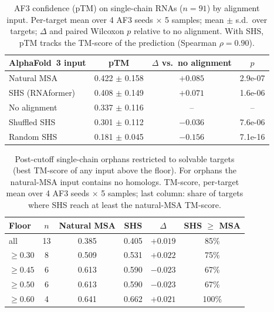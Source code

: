 \begin{table}[t]
\centering
\caption{AF3 confidence (pTM) on single-chain RNAs ($n{=}91$) by alignment input. Per-target mean over 4 AF3 seeds $\times$ 5 samples; mean $\pm$ s.d.\ over targets; $\Delta$ and paired Wilcoxon $p$ relative to no alignment. With SHS, pTM tracks the TM-score of the prediction (Spearman $\rho{=}0.90$).}
\label{tab:confidence}
\begin{tabular}{lccc}
\toprule
AlphaFold~3 input & pTM & $\Delta$ vs.\ no alignment & $p$ \\
\midrule
Natural MSA & 0.422 $\pm$ 0.158 & $+0.085$ & 2.9e-07 \\
SHS (RNAformer) & 0.408 $\pm$ 0.149 & $+0.071$ & 1.6e-06 \\
No alignment & 0.337 $\pm$ 0.116 & -- & -- \\
Shuffled SHS & 0.301 $\pm$ 0.112 & $-0.036$ & 7.6e-06 \\
Random SHS & 0.181 $\pm$ 0.045 & $-0.156$ & 7.1e-16 \\
\bottomrule
\end{tabular}
\end{table}

\begin{table}[t]
\centering
\caption{Post-cutoff single-chain orphans restricted to solvable targets (best TM-score of any input above the floor). For orphans the natural-MSA input contains no homologs. TM-score, per-target mean over 4 AF3 seeds $\times$ 5 samples; last column: share of targets where SHS reach at least the natural-MSA TM-score.}
\label{tab:near_floor}
\begin{tabular}{lccccc}
\toprule
Floor & $n$ & Natural MSA & SHS & $\Delta$ & SHS $\ge$ MSA \\
\midrule
all & 13 & 0.385 & 0.405 & $+0.019$ & 85\% \\
$\ge 0.30$ & 8 & 0.509 & 0.531 & $+0.022$ & 75\% \\
$\ge 0.45$ & 6 & 0.613 & 0.590 & $-0.023$ & 67\% \\
$\ge 0.50$ & 6 & 0.613 & 0.590 & $-0.023$ & 67\% \\
$\ge 0.60$ & 4 & 0.641 & 0.662 & $+0.021$ & 100\% \\
\bottomrule
\end{tabular}
\end{table}

